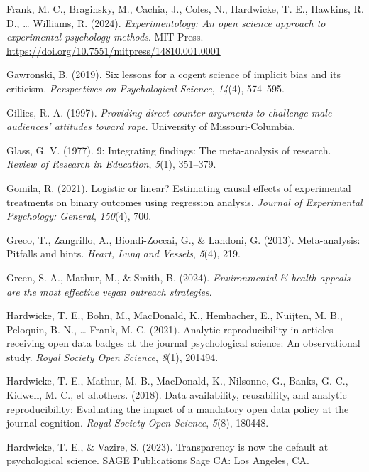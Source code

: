 \documentclass[
  man]{apa6}
\newlength{\cslhangindent}
\newenvironment{CSLReferences}[2] %
 {\begin{list}{}{%
  \setlength{\itemindent}{0pt}
  \setlength{\leftmargin}{0pt}
  \setlength{\parsep}{0pt}
  \ifodd #1
   \setlength{\leftmargin}{\cslhangindent}
   \setlength{\itemindent}{-1\cslhangindent}
  \fi
  \setlength{\itemsep}{#2\baselineskip}}}
 {\end{list}}
\begin{document}
\begin{CSLReferences}{1}{0}
Frank, M. C., Braginsky, M., Cachia, J., Coles, N., Hardwicke, T. E., Hawkins, R. D., \ldots{} Williams, R. (2024). \emph{Experimentology: An open science approach to experimental psychology methods}. MIT Press. \url{https://doi.org/10.7551/mitpress/14810.001.0001}

Gawronski, B. (2019). Six lessons for a cogent science of implicit bias and its criticism. \emph{Perspectives on Psychological Science}, \emph{14}(4), 574--595.

Gillies, R. A. (1997). \emph{Providing direct counter-arguments to challenge male audiences' attitudes toward rape}. University of Missouri-Columbia.

Glass, G. V. (1977). 9: Integrating findings: The meta-analysis of research. \emph{Review of Research in Education}, \emph{5}(1), 351--379.

Gomila, R. (2021). Logistic or linear? Estimating causal effects of experimental treatments on binary outcomes using regression analysis. \emph{Journal of Experimental Psychology: General}, \emph{150}(4), 700.

Greco, T., Zangrillo, A., Biondi-Zoccai, G., \& Landoni, G. (2013). Meta-analysis: Pitfalls and hints. \emph{Heart, Lung and Vessels}, \emph{5}(4), 219.

Green, S. A., Mathur, M., \& Smith, B. (2024). \emph{Environmental \& health appeals are the most effective vegan outreach strategies}.

Hardwicke, T. E., Bohn, M., MacDonald, K., Hembacher, E., Nuijten, M. B., Peloquin, B. N., \ldots{} Frank, M. C. (2021). Analytic reproducibility in articles receiving open data badges at the journal psychological science: An observational study. \emph{Royal Society Open Science}, \emph{8}(1), 201494.

Hardwicke, T. E., Mathur, M. B., MacDonald, K., Nilsonne, G., Banks, G. C., Kidwell, M. C., et al.others. (2018). Data availability, reusability, and analytic reproducibility: Evaluating the impact of a mandatory open data policy at the journal cognition. \emph{Royal Society Open Science}, \emph{5}(8), 180448.

Hardwicke, T. E., \& Vazire, S. (2023). Transparency is now the default at psychological science. SAGE Publications Sage CA: Los Angeles, CA.


\end{CSLReferences}
\end{document}
